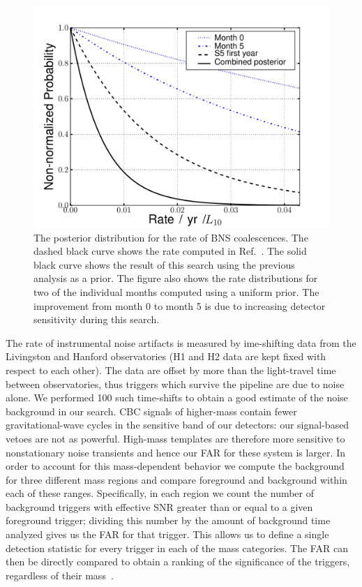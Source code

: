 \begin{figure}
\center
\includegraphics[width=6in]{figures/S5_lowmass_18_month_combined_bns_nonspin-posterior-comparison}
\caption{The posterior distribution for the rate of \ac{BNS} coalescences. The
dashed black curve shows the rate computed in Ref.~\cite{Collaboration:2009tt}.
The solid black curve shows the result of this search using the previous
analysis as a prior. The figure also shows the rate distributions for two of
the  individual months computed using a uniform prior. The improvement from
month 0 to month 5 is due to increasing detector sensitivity during this
search.  }  
   \label{fig:ul}
\end{figure}

The rate of instrumental noise artifacts is measured by ime-shifting data from 
the Livingston and Hanford observatories (H1 and H2 data are kept fixed with 
respect to each other). The data are offset by more than the light-travel time 
between observatories, thus triggers which survive the pipeline are due to 
noise alone. We performed 100 such time-shifts to obtain a good estimate of 
the noise background in our search. \ac{CBC} signals of higher-mass contain 
fewer gravitational-wave cycles in the sensitive band of our detectors: 
our signal-based vetoes are not as powerful. High-mass templates are therefore 
more sensitive to nonstationary noise transients and hence our \ac{FAR} for 
these system is larger. In order to account for this mass-dependent behavior 
we compute the background for three different mass regions and compare 
foreground and background within each of these ranges. Specifically, in each
region we count the number of background triggers with effective
\ac{SNR} greater than or equal to a given foreground trigger; dividing
this number by the amount of background time analyzed gives us the
\ac{FAR} for that trigger. This allows us to define a single detection
statistic for every trigger in each of the mass categories.  The
\ac{FAR} can then be directly compared to obtain a ranking of the
significance of the triggers, regardless of their
mass~\cite{Collaboration:2009tt}. 

